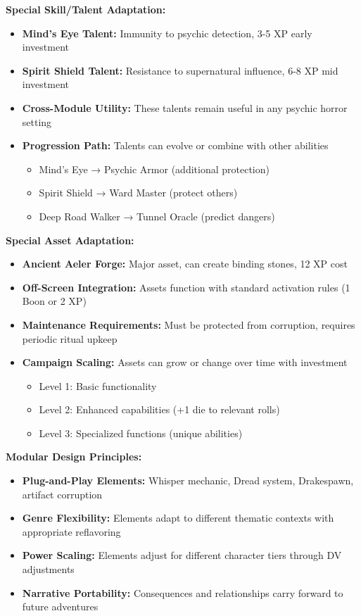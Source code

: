 \documentclass[11pt]{article}
\begin{document}
\textbf{Special Skill/Talent Adaptation:} \begin{itemize} \item \textbf{Mind's Eye Talent:} Immunity to psychic detection, 3-5 XP early investment \item \textbf{Spirit Shield Talent:} Resistance to supernatural influence, 6-8 XP mid investment \item \textbf{Cross-Module Utility:} These talents remain useful in any psychic horror setting \item \textbf{Progression Path:} Talents can evolve or combine with other abilities \begin{itemize} \item Mind's Eye → Psychic Armor (additional protection) \item Spirit Shield → Ward Master (protect others) \item Deep Road Walker → Tunnel Oracle (predict dangers) \end{itemize} \end{itemize}

\textbf{Special Asset Adaptation:} \begin{itemize} \item \textbf{Ancient Aeler Forge:} Major asset, can create binding stones, 12 XP cost \item \textbf{Off-Screen Integration:} Assets function with standard activation rules (1 Boon or 2 XP) \item \textbf{Maintenance Requirements:} Must be protected from corruption, requires periodic ritual upkeep \item \textbf{Campaign Scaling:} Assets can grow or change over time with investment \begin{itemize} \item Level 1: Basic functionality \item Level 2: Enhanced capabilities (+1 die to relevant rolls) \item Level 3: Specialized functions (unique abilities) \end{itemize} \end{itemize}

\textbf{Modular Design Principles:} \begin{itemize} \item \textbf{Plug-and-Play Elements:} Whisper mechanic, Dread system, Drakespawn, artifact corruption \item \textbf{Genre Flexibility:} Elements adapt to different thematic contexts with appropriate reflavoring \item \textbf{Power Scaling:} Elements adjust for different character tiers through DV adjustments \item \textbf{Narrative Portability:} Consequences and relationships carry forward to future adventures \end{itemize}
\end{document}
